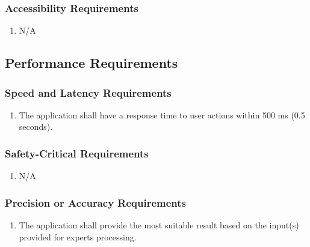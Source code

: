 \documentclass[]{article}
\begin{document}
\subsubsection{Accessibility Requirements}
\label{ssub:accessibility_requirements}
\begin{enumerate}[{UH}1. ]
	\item N/A
\end{enumerate}


\subsection{Performance Requirements}
\label{sub:performance_requirements}

\subsubsection{Speed and Latency Requirements}
\label{ssub:speed_and_latency_requirements}
\begin{enumerate}[{PR}1. ]
	\item The application shall have a response time to user actions within 500 ms (0.5 seconds).	
\end{enumerate}

\subsubsection{Safety-Critical Requirements}
\label{ssub:safety_critical_requirements}
\begin{enumerate}[{PR}1. ]
	\item N/A
\end{enumerate}

\subsubsection{Precision or Accuracy Requirements}
\label{ssub:precision_or_accuracy_requirements}
\begin{enumerate}[{PR}1. ]
	\item The application shall provide the most suitable result based on the input(s) provided for experts processing.
\end{enumerate}
\end{document}
